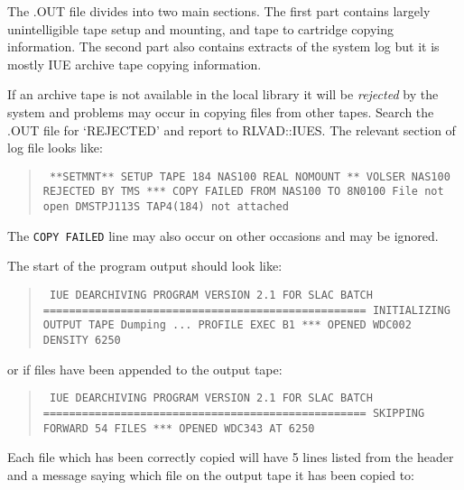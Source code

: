 The .OUT file divides into two main sections. The first part contains largely
unintelligible tape setup and mounting, and tape to cartridge copying 
information. The second part also contains extracts of the system log but it
is mostly IUE archive tape copying information.

If an archive tape is not available in the local library it will be 
{\it rejected} by the system and problems may occur in copying files from other
tapes. Search the .OUT file for `REJECTED' and report to RLVAD::IUES.
The relevant section of log file looks like:

\begin{quote}
{\small
\tt
**SETMNT** SETUP TAPE 184 NAS100 REAL NOMOUNT
\newline
** VOLSER NAS100 REJECTED BY TMS
\newline
*** COPY FAILED FROM NAS100 TO 8N0100
\newline
File not open
\newline
DMSTPJ113S TAP4(184) not attached
}
\end{quote}

\rm
The {\tt COPY FAILED} line may also occur on other occasions and may be ignored.

The start of the program output should look like:

\begin{quote}
{\small
\tt
  IUE DEARCHIVING PROGRAM VERSION 2.1 FOR SLAC BATCH
\newline
  ==================================================
\newline
INITIALIZING OUTPUT TAPE
\newline
 Dumping ...
\newline
 PROFILE  EXEC     B1
\newline
 ***  OPENED WDC002 DENSITY       6250
}
\end{quote}

\rm
or if files have been appended to the output tape:

\begin{quote}
{\small
\tt
  IUE DEARCHIVING PROGRAM VERSION 2.1 FOR SLAC BATCH
\newline
  ==================================================
\newline
SKIPPING FORWARD         54  FILES
\newline
***  OPENED WDC343 AT 6250
}
\end{quote}

\rm
Each file which has been correctly copied will have 5 lines listed from the 
header and a message saying which file on the output tape it has been copied
to:

